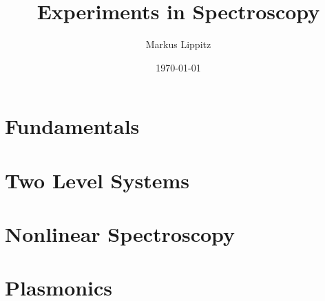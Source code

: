 \documentclass[notoc,nofonts,a4paper,twoside,nobib]{tufte-book}
\renewcommand{\chaptername}{Chapter\ }
\begin{document}
  \tikzexternaldisable


\title{Experiments in Spectroscopy}

\author{Markus Lippitz}
\date{\today}


\maketitle


%
\tableofcontents



%
\part{Fundamentals}






%
\part{Two Level Systems}





\part{Nonlinear Spectroscopy}






\part{Plasmonics}





%
%
%
%
%
%
%
\renewcommand{\chaptername}{Appendix\ }

\appendix
\appendixpage

%






\printbibliography
\end{document}
